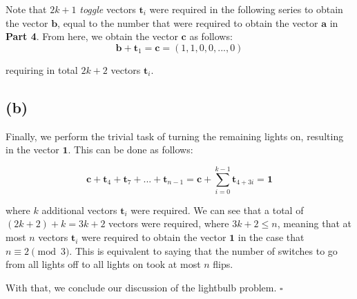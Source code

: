 \documentclass[12pt, letterpaper]{article}
\newcommand{\0}{\textbf{0}}
\newcommand{\1}{\textbf{1}}
\renewcommand{\t}{\textbf{t}}
\renewcommand{\a}{\textbf{a}}
\renewcommand{\b}{\textbf{b}}
\renewcommand{\c}{\textbf{c}}
\begin{document}
Note that $2k+1$ \emph{toggle} vectors $\t_i$ were required in the following series to obtain the vector $\b$, equal to the number that were required to obtain the vector $\a$ in \textbf{Part 4}. From here, we obtain the vector $\c$ as follows:
$$\b + \t_1 = \c = (1, 1, 0, 0, ..., 0)$$

requiring in total $2k+2$ vectors $\t_i$.

\subsection*{(b)}

Finally, we perform the trivial task of turning the remaining lights on, resulting in the vector $\1$. This can be done as follows:

$$\c + \t_4 + \t_7 + ... + \t_{n-1} = \c + \sum_{i=0}^{k-1} \t_{4+3i} = \1$$ 

where $k$ additional vectors $\t_i$ were required. We can see that a total of $(2k+2) + k = 3k+2$ vectors were required, where $3k+2 \le n$, meaning that at most $n$ vectors $\t_i$ were required to obtain the vector $\1$ in the case that $n \equiv 2\pmod{3}$. This is equivalent to saying that the number of switches to go from all lights off to all lights on took at most $n$ flips.

With that, we conclude our discussion of the lightbulb problem. $\square$
\end{document}
